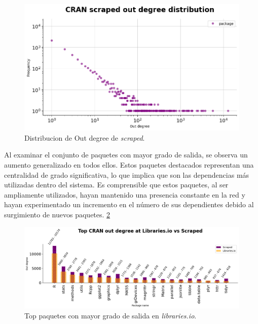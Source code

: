 \begin{figure}[h!]
    \begin{center}
        \includegraphics[width=1\textwidth]{img/cran/out_deg2.png}
        \caption{Distribucion de Out degree de \textit{scraped}.}
        \label{fig:cran_out_scraped}
    \end{center}
\end{figure}

Al examinar el conjunto de paquetes con mayor grado de salida, se observa un aumento generalizado
en todos ellos. Estos paquetes destacados representan una centralidad de grado significativa,
lo que implica que son las dependencias más utilizadas dentro del sistema. Es comprensible que
estos paquetes, al ser ampliamente utilizados, hayan mantenido una presencia constante en la
red y hayan experimentado un incremento en el número de sus dependientes debido al surgimiento
de nuevos paquetes. \ref{fig:cran_out_libio_top}

\begin{figure}[h!]
    \begin{center}
        \includegraphics[width=1\textwidth]{img/cran/out_lib.png}
        \caption{Top paquetes con mayor grado de salida en \textit{libraries.io}.}
        \label{fig:cran_out_libio_top}
    \end{center}
\end{figure}

